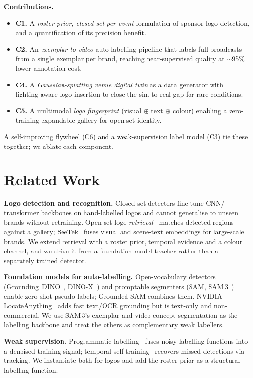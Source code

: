 \documentclass[conference]{IEEEtran}
\begin{document}
\noindent\textbf{Contributions.}
\begin{itemize}
  \item \textbf{C1.} A \emph{roster-prior, closed-set-per-event} formulation of
  sponsor-logo detection, and a quantification of its precision benefit.
  \item \textbf{C2.} An \emph{exemplar-to-video} auto-labelling pipeline that
  labels full broadcasts from a single exemplar per brand, reaching
  near-supervised quality at $\sim$95\% lower annotation cost.
  \item \textbf{C4.} A \emph{Gaussian-splatting venue digital twin} as a
  data generator with lighting-aware logo insertion to close the sim-to-real gap
  for rare conditions.
  \item \textbf{C5.} A multimodal \emph{logo fingerprint}
  (visual $\oplus$ text $\oplus$ colour) enabling a zero-training expandable
  gallery for open-set identity.
\end{itemize}
A self-improving flywheel (C6) and a weak-supervision label model (C3) tie these
together; we ablate each component.

\section{Related Work}
\textbf{Logo detection and recognition.} Closed-set detectors fine-tune CNN/
transformer backbones on hand-labelled logos and cannot generalise to unseen
brands without retraining. Open-set logo \emph{retrieval}~\cite{osld,seetek}
matches detected regions against a gallery; SeeTek~\cite{seetek} fuses visual and
scene-text embeddings for large-scale brands. We extend retrieval with a roster
prior, temporal evidence and a colour channel, and we drive it from a
foundation-model teacher rather than a separately trained detector.

\textbf{Foundation models for auto-labelling.} Open-vocabulary detectors
(Grounding~DINO~\cite{gdino}, DINO-X~\cite{dinox}) and promptable segmenters
(SAM, SAM\,3~\cite{sam3}) enable zero-shot pseudo-labels; Grounded-SAM combines
them. NVIDIA LocateAnything~\cite{locateanything} adds fast text/OCR grounding
but is text-only and non-commercial. We use SAM\,3's exemplar-and-video concept
segmentation as the labelling backbone and treat the others as complementary
weak labellers.

\textbf{Weak supervision.} Programmatic labelling~\cite{snorkel} fuses noisy
labelling functions into a denoised training signal; temporal
self-training~\cite{trackrefine,tempt} recovers missed detections via tracking.
We instantiate both for logos and add the roster prior as a structural labelling
function.
\end{document}
